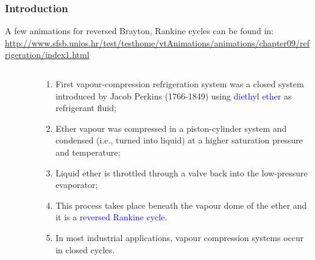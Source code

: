 \documentclass[10pt,compress,handout,unknownkeysallowed]{beamer}
\begin{document}
\begin{frame}
 \frametitle{Introduction}

  \scriptsize A few animations for reversed Brayton, Rankine cycles can be found in:
\href{http://www.sfsb.unios.hr/test/testhome/vtAnimations/animations/chapter09/refrigeration/index1.html}{\scriptsize{http://www.sfsb.unios.hr/test/testhome/vtAnimations/animations/chapter09/refrigeration/index1.html}}


  \begin{columns}
   \begin{column}[c]{0.45\linewidth}
    \begin{figure}%
     \begin{center}
     \end{center}
    \end{figure}  
   \end{column}  
   \begin{column}[c]{0.55\linewidth}
  \begin{enumerate}[(1)]\scriptsize
   \item <2-> First vapour-compression refrigeration system was a closed system introduced by Jacob Perkins (1766-1849) using \textcolor{blue}{diethyl ether} as refrigerant fluid;
   \item <2-> Ether vapour was compressed in a piston-cylinder system and condensed (i.e., turned into liquid) at a higher saturation pressure and temperature;
   \item <2-> Liquid ether is throttled through a valve back into the low-pressure evaporator;
   \item <2-> This process takes place beneath the vapour dome of the ether and it is a \textcolor{blue}{reversed Rankine cycle}.
   \item <3-> In most industrial applications, vapour compression systems occur in closed cycles.
  \end{enumerate}
 \end{column}  
\end{columns}

\end{frame}
\end{document}
